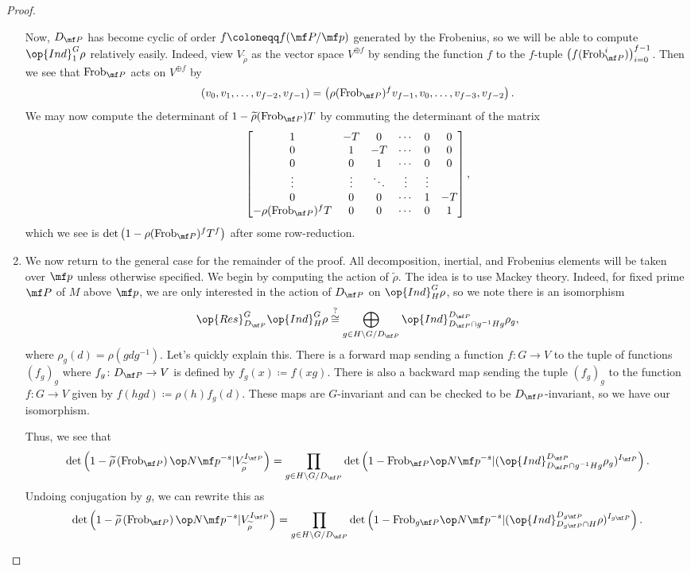 \documentclass[../thesis.tex]{subfiles}
\begin{document}
\begin{proof}
\begin{enumerate}
		Now, $D_{\mf P}$ has become cyclic of order $f\coloneqq f(\mf P/\mf p)$ generated by the Frobenius, so we will be able to compute $\op{Ind}_1^G\rho$ relatively easily. Indeed, view $V_{\widetilde\rho}$ as the vector space $V^{\oplus f}$ by sending the function $f$ to the $f$-tuple $\left(f(\mathrm{Frob}_{\mf P}^i)\right)_{i=0}^{f-1}$. Then we see that $\mathrm{Frob}_{\mf P}$ acts on $V^{\oplus f}$ by
		\[(v_0,v_1,\ldots,v_{f-2},v_{f-1})=\left(\rho(\mathrm{Frob}_{\mf P})^fv_{f-1},v_0,\ldots,v_{f-3},v_{f-2}\right).\]
		We may now compute the determinant of $1-\widetilde\rho(\mathrm{Frob}_{\mf P})T$ by commuting the determinant of the matrix
		\[\begin{bmatrix}
			1 & -T & 0 & \cdots & 0 & 0 \\
			0 & 1 & -T & \cdots & 0 & 0 \\
			0 & 0 & 1 & \cdots & 0 & 0 \\
			\vdots & \vdots & \ddots & \vdots & \vdots \\
			0 & 0 & 0 & \cdots & 1 & -T \\
			-\rho(\mathrm{Frob}_{\mf P})^fT & 0 & 0 & \cdots & 0 & 1
		\end{bmatrix},\]
		which we see is $\det\left(1-\rho(\mathrm{Frob}_{\mf P})^fT^f\right)$ after some row-reduction.

		\item We now return to the general case for the remainder of the proof. All decomposition, inertial, and Frobenius elements will be taken over $\mf p$ unless otherwise specified. We begin by computing the action of $\widetilde\rho$. The idea is to use Mackey theory. Indeed, for fixed prime $\mf P$ of $M$ above $\mf p$, we are only interested in the action of $D_{\mf P}$ on $\op{Ind}_H^G\rho$, so we note there is an isomorphism
		\[\op{Res}^G_{D_{\mf P}}\op{Ind}_H^G\rho\stackrel?\cong\bigoplus_{g\in H\backslash G/D_{\mf P}}\op{Ind}_{D_{\mf P}\cap g^{-1}Hg}^{D_{\mf P}}\rho_g,\]
		where $\rho_g\left(d\right)=\rho\left(gdg^{-1}\right)$. Let's quickly explain this. There is a forward map sending a function $f\colon G\to V$ to the tuple of functions $(f_g)_g$ where $f_g\colon D_{\mf P}\to V$ is defined by $f_g(x)\coloneqq f\left(xg\right)$. There is also a backward map sending the tuple $(f_g)_g$ to the function $f\colon G\to V$ given by $f(hgd)\coloneqq\rho(h)f_g(d)$. These maps are $G$-invariant and can be checked to be $D_{\mf P}$-invariant, so we have our isomorphism.

		Thus, we see that
		\[\det\left(1-\widetilde\rho\left(\mathrm{Frob}_{\mf P}\right)\op N\mf p^{-s}\vert V_{\widetilde\rho}^{I_{\mf P}}\right)=\prod_{g\in H\backslash G/D_{\mf P}}\det\left(1-\mathrm{Frob}_{\mf P}\op N\mf p^{-s}\vert (\op{Ind}^{D_{\mf P}}_{D_{\mf P}\cap g^{-1}Hg}{\rho_g})^{I_{\mf P}}\right).\]
		Undoing conjugation by $g$, we can rewrite this as
		\[\det\left(1-\widetilde\rho\left(\mathrm{Frob}_{\mf P}\right)\op N\mf p^{-s}\vert V_{\widetilde\rho}^{I_{\mf P}}\right)=\prod_{g\in H\backslash G/D_{\mf P}}\det\left(1-\mathrm{Frob}_{g\mf P}\op N\mf p^{-s}\vert (\op{Ind}^{D_{g\mf P}}_{D_{g\mf P}\cap H}\rho)^{I_{g\mf P}}\right).\]


\end{enumerate}
\end{proof}
\end{document}
